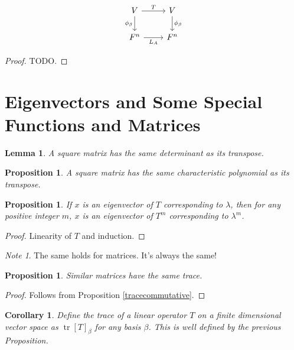 \documentclass[12pt]{article}
\theoremstyle{plain}
\newtheorem{corollary}[theorem]{Corollary}
\newtheorem{lemma}[theorem]{Lemma}
\newtheorem{proposition}[theorem]{Proposition}
\theoremstyle{definition}
\theoremstyle{remark}
\newtheorem{note}[theorem]{Note}
\DeclareMathOperator{\tr}{tr}
\begin{document}
\begin{figure}[H]
$$\begin{tikzcd}
V \arrow{r}{T} \arrow[swap]{d}{\phi_\beta} & V \arrow{d}{\phi_\beta} \\
F^n \arrow[swap]{r}{L_A} & F^n
\end{tikzcd}$$
\end{figure}

\begin{proof}
TODO.
\end{proof}

\section{Eigenvectors and Some Special Functions and Matrices}

\begin{lemma}
A square matrix has the same determinant as its transpose.
\end{lemma}

\begin{proposition}
A square matrix has the same characteristic polynomial as its transpose.
\end{proposition}

\begin{proposition}
If $x$ is an eigenvector of $T$ corresponding to $\lambda$, then for any positive integer $m$, $x$ is an eigenvector of $T^m$ corresponding to $\lambda^m$.
\end{proposition}

\begin{proof}
Linearity of $T$ and induction.
\end{proof}

\begin{note}
The same holds for matrices. It's always the same!
\end{note}

\begin{proposition}
Similar matrices have the same trace.
\end{proposition}

\begin{proof}
Follows from Proposition \ref{tracecommutative}.
\end{proof}

\begin{corollary}
Define the trace of a linear operator $T$ on a finite dimensional vector space as $\tr [T]_\beta$ for any basis $\beta$. This is well defined by the previous Proposition.
\end{corollary}
\end{document}

